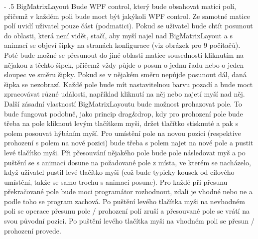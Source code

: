 \documentclass[12pt]{article}
\makeatletter
\renewcommand\paragraph{%
    \@startsection{paragraph}{4}{0mm}%
       {-\baselineskip}%
       {.5\baselineskip}%
       {\normalfont\normalsize\bfseries}}
\makeatother
\begin{document}
\paragraph{BigMatrixLayout}
Bude WPF control, který bude obsahovat matici polí, přičemž v každém poli bude moct být jakýkoli WPF control. Ze samotné matice polí uvidí uživatel pouze část (podmatici). Pokud se uživatel bude chtít posunout do oblasti, která není vidět, stačí, aby myší najel nad BigMatrixLayout a s animací se objeví šipky na stranách konfigurace (viz obrázek pro 9 počítačů). Poté bude možné se přesunout do jiné oblasti matice sousednosti kliknutím na nějakou z těchto šipek, přičemž vždy půjde o posun o jednu řadu nebo o jeden sloupec ve směru šipky. Pokud se v nějakém směru nepůjde posunout dál, daná šipka se nezobrazí. Každé pole bude mít nastavitelnou barvu pozadí a bude moct zpracovávat různé události, například kliknutí na něj nebo najetí myší nad něj. Další zásadní vlastností BigMatrixLayoutu bude možnost prohazovat pole. To bude fungovat podobně, jako princip drag\&drop, kdy pro prohození pole bude třeba na pole kliknout levým tlačítkem myši, držet tlačítko stisknuté a pak s polem posouvat hýbáním myší. Pro umístění pole na novou pozici (respektive prohození s polem na nové pozici) bude třeba s polem najet na nové pole a pustit levé tlačítko myši. Při přesouvání nějakého pole bude pole následovat myš a po puštění se s animací dosune na požadované pole z místa, ve kterém se nacházelo, když uživatel pustil levé tlačítko myši (což bude typicky kousek od cílového umístění, takže se samo trochu s animací posune). Pro každé při přesunu překračované pole bude moci programátor rozhodnout, zdali je vhodné nebo ne a podle toho se program zachová. Po puštění levého tlačítka myši na nevhodném poli se operace přesunu pole / prohození polí zruší a přesouvané pole se vrátí na svou původní pozici. Po puštění levého tlačítka myši na vhodném poli se přesun / prohození provede.
\end{document}
